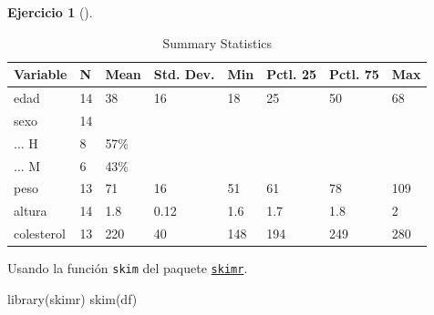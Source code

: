 \documentclass[
  a4paper,
]{scrreport}
\newenvironment{Shaded}{\begin{snugshade}}{\end{snugshade}}
\newcommand{\FunctionTok}[1]{\textcolor[rgb]{0.28,0.35,0.67}{#1}}
\newcommand{\NormalTok}[1]{\textcolor[rgb]{0.00,0.23,0.31}{#1}}
\theoremstyle{definition}
\newtheorem{exercise}{Ejercicio}[chapter]
\theoremstyle{remark}
\begin{document}
\begin{exercise}[]
\begin{enumerate}
\begin{tcolorbox}
\begin{table}
  \caption{\label{tab:unnamed-chunk-22}Summary Statistics}
  \centering
  \begin{tabular}[t]{llllllll}
  \toprule
  Variable & N & Mean & Std. Dev. & Min & Pctl. 25 & Pctl. 75 & Max\\
  \midrule
  edad & 14 & 38 & 16 & 18 & 25 & 50 & 68\\
  sexo & 14 &  &  &  &  &  & \\
  ... H & 8 & 57\% &  &  &  &  & \\
  ... M & 6 & 43\% &  &  &  &  & \\
  peso & 13 & 71 & 16 & 51 & 61 & 78 & 109\\
  \addlinespace
  altura & 14 & 1.8 & 0.12 & 1.6 & 1.7 & 1.8 & 2\\
  colesterol & 13 & 220 & 40 & 148 & 194 & 249 & 280\\
  \bottomrule
  \end{tabular}
  \end{table}

  \end{tcolorbox}

  \begin{tcolorbox}[enhanced jigsaw, toprule=.15mm, rightrule=.15mm, arc=.35mm, colback=white, colbacktitle=quarto-callout-tip-color!10!white, toptitle=1mm, left=2mm, colframe=quarto-callout-tip-color-frame, opacityback=0, breakable, opacitybacktitle=0.6, bottomtitle=1mm, titlerule=0mm, title=\textcolor{quarto-callout-tip-color}{\faLightbulb}\hspace{0.5em}{Solución 3}, bottomrule=.15mm, coltitle=black, leftrule=.75mm]

  Usando la función \texttt{skim} del paquete
  \href{https://cran.r-project.org/web/packages/skimr/vignettes/skimr.html}{\texttt{skimr}}.

\begin{Shaded}
\begin{Highlighting}[]
\FunctionTok{library}\NormalTok{(skimr)}
\FunctionTok{skim}\NormalTok{(df)}
\end{Highlighting}
\end{Shaded}

  \begin{table}


\end{table}
\end{tcolorbox}
\end{enumerate}
\end{exercise}
\end{document}
